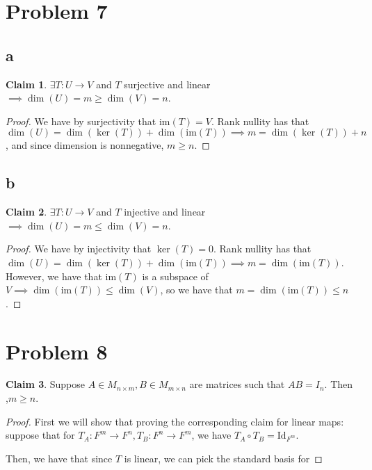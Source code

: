 \documentclass[12pt,letterpaper]{article}
\theoremstyle{definition}
\newtheorem*{claim}{Claim}
\newcommand{\id}{\mathrm{Id}}
\newcommand{\im}{\mathrm{im}}
\begin{document}
\section*{Problem 7}

\subsection*{a}

\begin{claim}
  $\exists T: U \rightarrow V$ and $T$ surjective and linear $\implies \dim(U) = m \geq
  \dim(V) = n$.
\end{claim}

\begin{proof}
  We have by surjectivity that $\im(T) = V$. Rank nullity has that $\dim(U) =
  \dim(\ker(T)) + \dim(\im(T)) \implies m = \dim(\ker(T)) + n$, and since
  dimension is nonnegative, $m \geq n$.
\end{proof}

\subsection*{b}

\begin{claim}
  $\exists T: U \rightarrow V$ and $T$ injective and linear $\implies \dim(U) = m \leq
  \dim(V) = n$.
\end{claim}

\begin{proof}
  We have by injectivity that $\ker(T) = {0}$. Rank nullity has that $\dim(U) =
  \dim(\ker(T)) + \dim(\im(T)) \implies m = \dim(\im(T))$. However, we have that
  $\im(T)$ is a subspace of $V \implies \dim(\im(T)) \leq \dim(V)$, so we have
  that $m = \dim(\im(T)) \leq n$.
\end{proof}


\section*{Problem 8}

\begin{claim}
  Suppose $A \in M_{n \times m}, B \in M_{m \times n}$ are matrices such that
  $AB = I_n$. Then ,$m \geq n$.
\end{claim}

\begin{proof}
  First we  will show that proving the corresponding claim for linear maps:
  suppose that for $T_A: F^m \rightarrow F^n, T_B: F^n \rightarrow F^m$, we have
  $T_A \circ T_B = \id_{F^m}$.

  Then, we have that since $T$ is linear, we can pick the standard basis for 
\end{proof}
\end{document}
